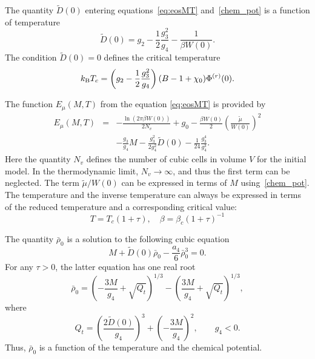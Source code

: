 \documentclass[12pt]{article}
\begin{document}
	The quantity $\tilde D(0)$ entering equations~\eqref{eq:eosMT} and~\eqref{chem_pot} is a function of temperature
	\begin{equation}
	\tilde D(0) = g_2 - \frac{1}{2} \frac{g_3^2}{g_4} - \frac{1}{\beta W(0)}.
	\end{equation}
	The condition $\tilde{D}(0) = 0$ defines the critical temperature~\cite[see Eq.(31)]{KozlovskiiDobush2020}
	\begin{equation}
		k_{\rm B}T_c = \left(g_2 - \frac{1}{2} \frac{g_3^2}{g_4} \right) (B - 1 + \chi_0) \Phi^{(r)}(0).
	\end{equation}  
	
	The function $E_\mu(M, T)$ from the equation \eqref{eq:eosMT} is provided by
	\begin{eqnarray}\label{eq:E_mu}
		E_\mu (M, T) & = & - \frac{\ln (2\pi \beta W(0))}{2 N_v}  +  g_0 - \frac{\beta W(0)}{2} 
		\left(\frac{\tilde\mu}{W(0)} \right)^{2} 
		\nonumber\\
		&& - \frac{g_3}{g_4} {M} \! - \frac{g_3^2}{2 g_4^2}  \tilde D(0) - \frac{1}{24} \frac{g_3^4}{g_4^3}. 
	\end{eqnarray}
	Here the quantity $N_v$ defines the number of cubic cells in volume $V$ for the initial model.
	In the thermodynamic limit, $N_v \to \infty$, and thus the first term can be neglected. The term $\tilde{\mu}/W(0)$ can be expressed in terms of $M$ using~\eqref{chem_pot}. The temperature and the inverse temperature can always be expressed in terms of the reduced temperature and a corresponding critical value:
	\begin{equation*}
		T = T_c(1+\tau), \quad \beta = \beta_c (1 + \tau)^{-1}
	\end{equation*} 
	
	The quantity $\bar{\rho}_0$ is a solution to the following cubic equation
	\begin{equation}\label{eq:ro_M}
	M + \tilde D(0) \bar\rho_0 - \frac{a_4}{6} \bar\rho_0^3 = 0.
	\end{equation}
	For any $\tau > 0$, the latter equation has one real root
	\begin{equation}\label{eq:ro_MT}
	\bar \rho_0 = \left(- \frac{3 M}{g_4} + \sqrt{Q_t}\right)^{1/3} - \left(  \frac{3 M}{g_4} + \sqrt{Q_t} \right)^{1/3},
	\end{equation}
	where
	\begin{equation}
	Q_t = \left(  \frac{2\tilde D(0)}{g_4}\right)^3 + \left( -\frac{3 M}{g_4}\right)^2, \qquad g_4<0.
	\end{equation}
	Thus, $\bar{\rho}_0$ is a function of the temperature and the chemical potential.
	
\end{document}
